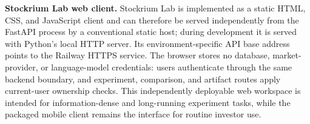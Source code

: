 \textbf{Stockrium Lab web client.} Stockrium Lab is implemented as a static HTML, CSS, and JavaScript client and can therefore be served independently from the FastAPI process by a conventional static host; during development it is served with Python's local HTTP server. Its environment-specific API base address points to the Railway HTTPS service. The browser stores no database, market-provider, or language-model credentials: users authenticate through the same backend boundary, and experiment, comparison, and artifact routes apply current-user ownership checks. This independently deployable web workspace is intended for information-dense and long-running experiment tasks, while the packaged mobile client remains the interface for routine investor use.
